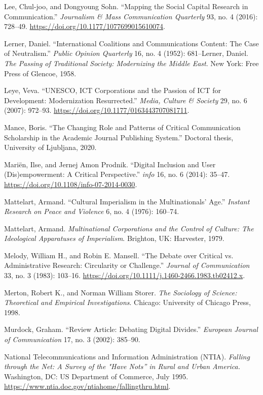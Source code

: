 \documentclass{tufte-handout}
\begin{document}
\begin{hangparas}{.25in}{1}
Lee, Chul-joo, and Dongyoung Sohn. ``Mapping the Social Capital Research
in Communication.'' \emph{Journalism \& Mass Communication Quarterly}
93, no. 4 (2016):
728--49. \url{https://doi.org/10.1177/1077699015610074}.

Lerner, Daniel. ``International Coalitions and Communications Content:
The Case of Neutralism.''\emph{ Public Opinion Quarterly} 16, no. 4
(1952): 681­--Lerner, Daniel. \emph{The Passing of Traditional Society:
Modernizing the Middle East}. New York: Free Press of Glencoe, 1958.

Leye, Veva. ``UNESCO, ICT Corporations and the Passion of ICT for
Development: Modernization Resurrected.'' \emph{Media, Culture \&
Society} 29, no. 6 (2007): 972--93.
\url{https://doi.org/10.1177/0163443707081711}.

Mance, Boris. ``The Changing Role and Patterns of Critical Communication
Scholarship in the Academic Journal Publishing System.'' Doctoral
thesis, University of Ljubljana, 2020.

Mariën, Ilse, and Jernej Amon Prodnik. ``Digital Inclusion and User
(Dis)empowerment: A Critical Perspective.'' \emph{info} 16, no. 6
(2014): 35--47. \url{https://doi.org/10.1108/info-07-2014-0030}.

Mattelart, Armand. ``Cultural Imperialism in the Multinationals' Age.''
\emph{Instant Research on Peace and Violence} 6, no. 4 (1976): 160--74.

Mattelart, Armand. \emph{Multinational Corporations and the Control of
Culture: The Ideological Apparatuses of Imperialism}. Brighton, UK:
Harvester, 1979.

Melody, William H., and Robin E. Mansell. ``The Debate over Critical vs.
Administrative Research: Circularity or Challenge.'' \emph{Journal of
Communication} 33, no. 3 (1983): 103--16.
\url{https://doi.org/10.1111/j.1460-2466.1983.tb02412.x}.

Merton, Robert K., and Norman William Storer. \emph{The Sociology of
Science: Theoretical and Empirical Investigations}. Chicago: University
of Chicago Press, 1998.

Murdock, Graham. ``Review Article: Debating Digital Divides.''
\emph{European Journal of Communication} 17, no. 3 (2002): 385--90.

National Telecommunications and Information Administration (NTIA).
\emph{Falling through the Net: A Survey of the "Have Nots'' in Rural and
Urban America.} Washington, DC: US Department of Commerce, July 1995.
\url{https://www.ntia.doc.gov/ntiahome/fallingthru.html}.


\end{hangparas}
\end{document}

